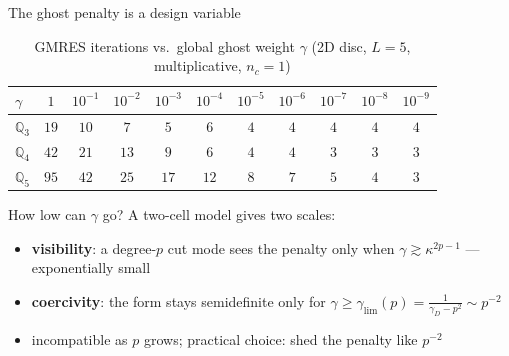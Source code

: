 \documentclass{beamer}
\begin{document}
\begin{frame}{The ghost penalty is a design variable}
    \begin{table}
        \centering
        \caption{GMRES iterations vs.\ global ghost weight $\gamma$ (2D disc, $L=5$, multiplicative, $n_c=1$)}
        \footnotesize
        \setlength{\tabcolsep}{4pt}
        \begin{tabular}{lcccccccccc}
            \toprule
            $\gamma$      & $1$  & $10^{-1}$ & $10^{-2}$ & $10^{-3}$ & $10^{-4}$ & $10^{-5}$ & $10^{-6}$ & $10^{-7}$ & $10^{-8}$ & $10^{-9}$ \\
            \midrule
            $\mathbb Q_3$ & $19$ & $10$      & $7$       & $5$       & $6$       & $4$       & $4$       & $4$       & $4$       & $4$       \\
            $\mathbb Q_4$ & $42$ & $21$      & $13$      & $9$       & $6$       & $4$       & $4$       & $3$       & $3$       & $3$       \\
            $\mathbb Q_5$ & $95$ & $42$      & $25$      & $17$      & $12$      & $8$       & $7$       & $5$       & $4$       & $3$       \\
            \bottomrule
        \end{tabular}
    \end{table}
    \pause
    \small
    How low can $\gamma$ go? A two-cell model gives two scales:
    \begin{itemize}
        \item \textbf{visibility}: a degree-$p$ cut mode sees the penalty only when $\gamma \gtrsim \kappa^{2p-1}$
              --- \alert{exponentially small}
        \item \textbf{coercivity}: the form stays semidefinite only for $\gamma \ge \gamma_{\lim}(p) = \frac{1}{\gamma_D - p^2}
                  \sim p^{-2}$
        \item[$\Rightarrow$] incompatible as $p$ grows; practical choice: \alert{shed the penalty like $p^{-2}$}
    \end{itemize}
\end{frame}
\end{document}
